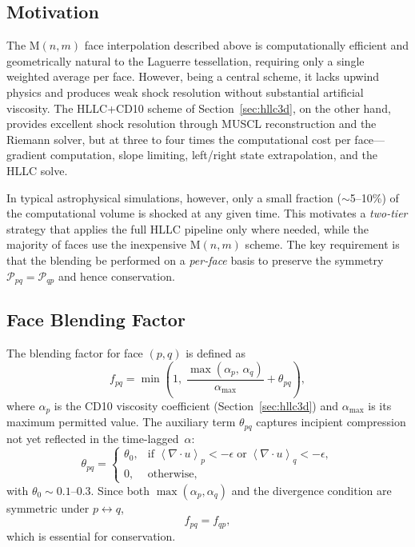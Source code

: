 \documentclass[twocolumn]{aastex63}
\newcommand{\vel}{{u}}
\newcommand{\pressure}[0]{\mathcal{P}}
\begin{document}
\subsection{Motivation}

The M$(n,m)$ face interpolation described above is computationally
efficient and geometrically natural to the Laguerre tessellation,
requiring only a single weighted average per face.
However, being a central scheme, it lacks upwind physics and
produces weak shock resolution without substantial artificial
viscosity.
The HLLC+CD10 scheme of Section~\ref{sec:hllc3d}, on the other
hand, provides excellent shock resolution through MUSCL
reconstruction and the Riemann solver, but at three to four times
the computational cost per face---gradient computation, slope
limiting, left/right state extrapolation, and the HLLC solve.

In typical astrophysical simulations, however, only a small
fraction ($\sim$5--10\%) of the computational volume is shocked
at any given time.
This motivates a \emph{two-tier} strategy that applies the
full HLLC pipeline only where needed, while the majority of
faces use the inexpensive M$(n,m)$ scheme.
The key requirement is that the blending be performed on a
\emph{per-face} basis to preserve the symmetry
$\pressure_{pq} = \pressure_{qp}$ and hence conservation.

\subsection{Face Blending Factor}

The blending factor for face $(p,q)$ is defined as
\begin{equation}\label{eq:fpq}
  f_{pq} = \min\!\left(1,\;
    \frac{\max(\alpha_p,\,\alpha_q)}{\alpha_{\max}}
    + \theta_{pq}\right),
\end{equation}
where $\alpha_p$ is the CD10 viscosity coefficient
(Section~\ref{sec:hllc3d}) and
$\alpha_{\max}$ is its maximum permitted value.
The auxiliary term $\theta_{pq}$ captures incipient
compression not yet reflected in the time-lagged~$\alpha$:
\begin{equation}\label{eq:theta}
  \theta_{pq} = \begin{cases}
    \theta_0, & \text{if }
      \left<\nabla\!\cdot\!\vel\right>_p < -\epsilon
      \;\text{or}\;
      \left<\nabla\!\cdot\!\vel\right>_q < -\epsilon, \\[4pt]
    0, & \text{otherwise},
  \end{cases}
\end{equation}
with $\theta_0 \sim 0.1$--$0.3$.
Since both $\max(\alpha_p,\alpha_q)$ and the divergence
condition are symmetric under $p\leftrightarrow q$,
\begin{equation}
  f_{pq} = f_{qp},
\end{equation}
which is essential for conservation.
\end{document}
